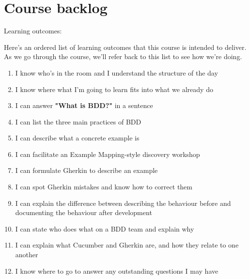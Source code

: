 \chapter*{Course backlog}

\ifnotes

    Learning outcomes:

\fi

\ifcontent

    Here's an ordered list of learning outcomes that this course is intended to deliver. As we go through the course, we'll refer back to this list to see how we're doing.
    
    \begin{enumerate}
        \item I know who's in the room and I understand the structure of the day
        \item I know where what I'm going to learn fits into what we already do
        \item I can answer \textbf{"What is BDD?"} in a sentence
        \item I can list the three main practices of BDD
        \item I can describe what a concrete example is
        \item I can facilitate an Example Mapping-style discovery workshop
        \item I can formulate Gherkin to describe an example
        \item I can spot Gherkin mistakes and know how to correct them
        \item I can explain the difference between describing the behaviour before and documenting the behaviour after development
        \item I can state who does what on a BDD team and explain why
        \item I can explain what Cucumber and Gherkin are, and how they relate to one another
        \item I know where to go to answer any outstanding questions I may have
    \end{enumerate}
    

\fi